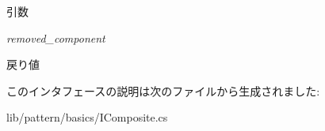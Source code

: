 \begin{DoxyParams}{引数}
\item[{\em removed\_\-component}]\end{DoxyParams}
\begin{DoxyReturn}{戻り値}

\end{DoxyReturn}


このインタフェースの説明は次のファイルから生成されました:\begin{DoxyCompactItemize}
\item 
lib/pattern/basics/IComposite.cs\end{DoxyCompactItemize}
